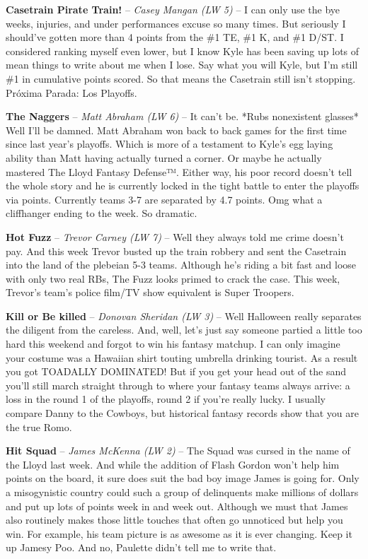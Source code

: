 \documentclass[11pt,letterpaper]{article}
\begin{document}
\begin{etaremune}
\item \textbf{Casetrain Pirate Train!} -- \textit{Casey Mangan (LW 5)} -- I can only use the bye weeks, injuries, and under performances excuse so many times. But seriously I should've gotten more than 4 points from the \#1 TE, \#1 K, and \#1 D/ST. I considered ranking myself even lower, but I know Kyle has been saving up lots of mean things to write about me when I lose. Say what you will Kyle, but I'm still \#1 in cumulative points scored. So that means the Casetrain still isn't stopping. Pr\'{o}xima Parada: Los Playoffs. 
\item \textbf{The Naggers} -- \textit{Matt Abraham (LW 6)} -- It can't be. *Rubs nonexistent glasses* Well I'll be damned. Matt Abraham won back to back games for the first time since last year's playoffs. Which is more of a testament to Kyle's egg laying ability than Matt having actually turned a corner. Or maybe he actually mastered The Lloyd Fantasy Defense™. Either way, his poor record doesn't tell the whole story and he is currently locked in the tight battle to enter the playoffs via points. Currently teams 3-7 are separated by 4.7 points. Omg what a cliffhanger ending to the week. So dramatic. 
\item \textbf{Hot Fuzz} -- \textit{Trevor Carney (LW 7)} -- Well they always told me crime doesn't pay. And this week Trevor busted up the train robbery and sent the Casetrain into the land of the plebeian 5-3 teams. Although he's riding a bit fast and loose with only two real RBs, The Fuzz looks primed to crack the case. This week, Trevor's team's police film/TV show equivalent is Super Troopers.
\item \textbf{Kill or Be killed} -- \textit{Donovan Sheridan (LW 3)} -- Well Halloween really separates the diligent from the careless. And, well, let's just say someone partied a little too hard this weekend and forgot to win his fantasy matchup. I can only imagine your costume was a Hawaiian shirt touting umbrella drinking tourist. As a result you got TOADALLY DOMINATED! But if you get your head out of the sand you'll still march straight through to where your fantasy teams always arrive: a loss in the round 1 of the playoffs, round 2 if you're really lucky. I usually compare Danny to the Cowboys, but historical fantasy records show that you are the true Romo.
\item \textbf{Hit Squad} -- \textit{James McKenna (LW 2)} -- The Squad was cursed in the name of the Lloyd last week. And while the addition of Flash Gordon won't help him points on the board, it sure does suit the bad boy image James is going for. Only a misogynistic country could such a group of delinquents make millions of dollars and put up lots of points week in and week out. Although we must that James also routinely makes those little touches that often go unnoticed but help you win. For example, his team picture is as awesome as it is ever changing. Keep it up Jamesy Poo. And no, Paulette didn't tell me to write that.  

\end{etaremune}
\end{document}
